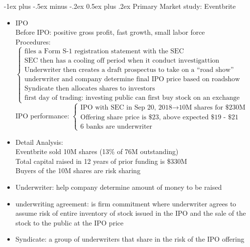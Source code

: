 \documentclass[10pt,landscape]{article}
\makeatletter
\renewcommand{\section}{\@startsection{section}{1}{0mm}%
                                {-1ex plus -.5ex minus -.2ex}%
                                {0.5ex plus .2ex}%
                                {\normalfont\large\bfseries}}
\makeatother
\begin{document}
\begin{multicols}{2}
	\section{Primary Market study: Eventbrite}
	\begin{itemize}
		\item IPO\\
			Before IPO: positive gross profit, fast growth, small labor force\\
			Procedures: $\begin{cases}
				\text{files a Form S-1 registration statement with the SEC}\\
				\text{SEC then has a cooling off period when it conduct investigattion}\\
				\text{Underwriter then creates a draft prospectus to take on a “road show”}\\
				\text{underwriter and company determine final IPO price based on roadshow}\\
				\text{Syndicate then allocates shares to investors}\\
				\text{first day of trading: investing public can first buy stock on an exchange}
			\end{cases}$\\
			IPO performance: $\begin{cases}
				\text{IPO with SEC in Sep 20, 2018} \longrightarrow \text{10M shares for \$230M}\\
				\text{Offering share price is \$23, above expected \$19 - \$21}\\
				\text{6 banks are underwriter}
			\end{cases}$
		\item Detail Analysis:\\
			Eventbrite sold 10M shares (13\% of 76M outstanding)\\
			Total capital raised in 12 years of prior funding is \$330M\\
			Buyers of the 10M shares are risk sharing
		\item Underwriter: help company determine amount of money to be raised
		\item underwriting agreement: is firm commitment where underwriter agrees to assume risk of entire inventory of stock issued in the IPO and the sale of the stock to the public at the IPO price
		\item Syndicate: a group of underwriters that share in the risk of the IPO offering
	\end{itemize}


\end{multicols}
\end{document}
